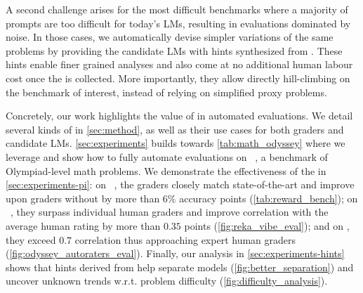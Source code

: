 A second challenge arises for the most difficult \NS benchmarks where a majority of prompts are too difficult for today's LMs, resulting in evaluations dominated by noise.
In those cases, we automatically devise simpler variations of the same problems by providing the candidate LMs with hints synthesized from \PI.
These hints enable finer grained analyses and also come at no additional human labour cost once the \PI is collected.
More importantly, they allow directly hill-climbing on the \NS benchmark of interest, instead of relying on simplified proxy problems.

Concretely, our work highlights the value of \PI in automated evaluations.
We detail several kinds of \PI in \cref{sec:method}, as well as their use cases for both graders and candidate LMs.
\cref{sec:experiments} builds towards \cref{tab:math_odyssey} where we leverage \PI and show how to fully automate evaluations on \MathOdyssey~\citep{Fang2024-go}, a \NS benchmark of Olympiad-level math problems.
We demonstrate the effectiveness of the \PI in \cref{sec:experiments-pi}:
on \RewardBench~\citep{lambert2024rewardbench}, the graders closely match state-of-the-art and improve upon graders without \PI by more than $6\%$ accuracy points (\cref{tab:reward_bench});
on \VibeEval~\citep{Padlewski2024-ag}, they surpass individual human graders and improve correlation with the average human rating by more than $0.35$ points (\cref{fig:reka_vibe_eval});
and on \MathOdyssey, they exceed $0.7$ correlation thus approaching expert human graders (\cref{fig:odyssey_autoraters_eval}).
Finally, our analysis in \cref{sec:experiments-hints} shows that hints derived from \PI help separate models (\cref{fig:better_separation}) and uncover unknown trends w.r.t. problem difficulty (\cref{fig:difficulty_analysis}).
